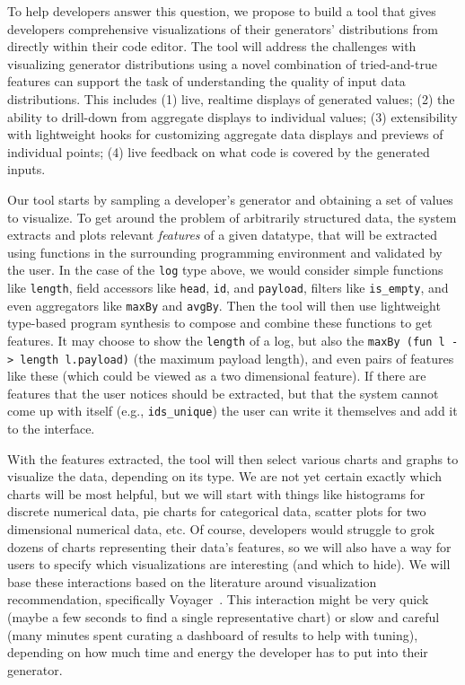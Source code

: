 To help developers answer this question, we propose to build a tool that gives
developers comprehensive visualizations of their generators' distributions from
directly within their code editor. The tool will address the challenges with
visualizing generator distributions using a novel combination of tried-and-true
features can support the task of understanding the quality of input data
distributions. This includes (1) live, realtime displays of generated values;
(2) the ability to drill-down from aggregate displays to individual values; (3)
extensibility with lightweight hooks for customizing aggregate data displays and
previews of individual points; (4) live feedback on what code is covered by the
generated inputs.

Our tool starts by sampling a developer's generator and obtaining a set of
values to visualize. To get around the problem of arbitrarily structured data,
the system extracts and plots relevant {\em features} of a given datatype, that
will be extracted using functions in the surrounding programming environment and
validated by the user. In the case of the \lstinline{log} type above, we would
consider simple functions like \lstinline{length}, field accessors like
\lstinline{head}, \lstinline{id}, and \lstinline{payload}, filters like
\lstinline{is_empty}, and even aggregators
like \lstinline{maxBy} and \lstinline{avgBy}. Then the tool will then use
lightweight type-based program synthesis to compose and combine these functions
to get features. It may choose to show the \lstinline{length} of a log, but also
the \lstinline{maxBy (fun l -> length l.payload)} (the maximum payload length),
and even pairs of features like these (which could be viewed as a two
dimensional feature).  If there are features that the user notices should be
extracted, but that the system cannot come up with itself (e.g.,
\lstinline{ids_unique}) the user can write it themselves and add it to the
interface.

With the features extracted, the tool will then select various charts and
graphs to visualize the data, depending on its type. We are not yet certain
exactly which charts will be most helpful, but we will start with things like
histograms for discrete numerical data, pie charts for categorical data, scatter
plots for two dimensional numerical data, etc.  Of course, developers would
struggle to grok dozens of charts representing their data's features, so
we will also have a way for users to specify which visualizations are
interesting (and which to hide). We will base these interactions based on the
literature around visualization recommendation, specifically
Voyager~\cite{wongsuphasawat_voyager_2016, wongsuphasawat_voyager_2017}. This
interaction might be very quick (maybe a few seconds to find a single
representative chart) or slow and careful (many minutes spent curating a
dashboard of results to help with tuning), depending on how much time and energy
the developer has to put into their generator.

